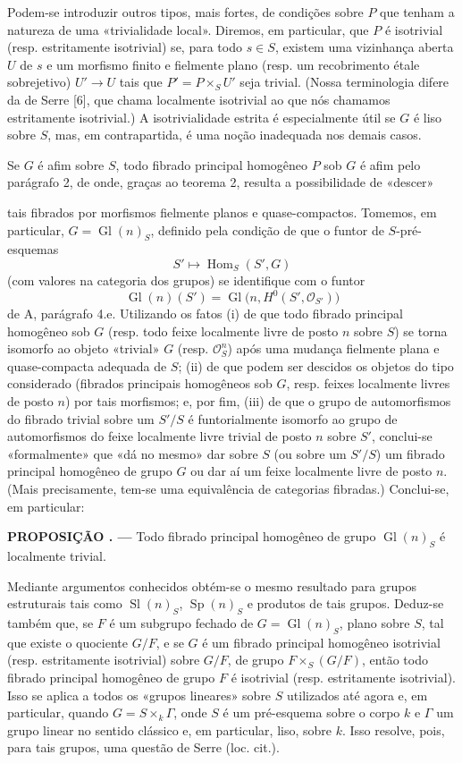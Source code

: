 \documentclass[11pt,twoside,openany]{book}
\numberwithin{equation}{section}
\newcommand{\src}[1]{%
  \phantomsection\hypertarget{src:#1}{}%
  \marginpar{\raggedleft\footnotesize\sffamily #1}%
}
\theoremstyle{plain}
\theoremstyle{definition}
\theoremstyle{remark}
\newcommand{\result}[2]{%
  \par\medskip\noindent\textbf{#1%
  \if\relax\detokenize{#2}\relax\else\space#2\fi. ---}\enspace
}
\newcommand{\FgaUnitKey}{frontmatter}
\renewcommand{\src}[1]{%
  \phantomsection\hypertarget{src:\FgaUnitKey:#1}{}%
  \marginpar{\raggedleft\footnotesize\sffamily #1}%
}
\begin{document}
Podem-se introduzir outros tipos, mais fortes, de condições sobre $P$ que
tenham a natureza de uma «trivialidade local». Diremos, em particular, que
$P$ é isotrivial (resp. estritamente isotrivial) se, para todo $s\in S$,
existem uma vizinhança aberta $U$ de $s$ e um morfismo finito e fielmente plano
(resp. um recobrimento étale sobrejetivo) $U'\longrightarrow U$ tais que
$P'=P\times_SU'$ seja trivial. (Nossa terminologia difere da de Serre [6], que
chama localmente isotrivial ao que nós chamamos estritamente isotrivial.) A
isotrivialidade estrita é especialmente útil se $G$ é liso sobre $S$, mas, em
contrapartida, é uma noção inadequada nos demais casos.

Se $G$ é afim sobre $S$, todo fibrado principal homogêneo $P$ sob $G$ é afim
pelo parágrafo 2, de onde, graças ao teorema 2, resulta a possibilidade de
«descer»

\src{326}
tais fibrados por morfismos fielmente planos e quase-compactos. Tomemos, em
particular, $G=\operatorname{Gl}(n)_S$, definido pela condição de que o
funtor de $S$-pré-esquemas
\[
  S'\longmapsto\operatorname{Hom}_S(S',G)
\]
(com valores na categoria dos grupos) se identifique com o funtor
\[
  \operatorname{Gl}(n)(S')
  =\operatorname{Gl}\bigl(n,H^0(S',\mathcal O_{S'})\bigr)
\]
de A, parágrafo 4.e. Utilizando os fatos (i) de que todo fibrado principal
homogêneo sob $G$ (resp. todo feixe localmente livre de posto $n$ sobre $S$) se
torna isomorfo ao objeto «trivial» $G$ (resp. $\mathcal O_S^n$) após uma mudança
fielmente plana e quase-compacta adequada de $S$; (ii) de que podem ser descidos
os objetos do tipo considerado (fibrados principais homogêneos sob $G$,
resp. feixes localmente livres de posto $n$) por tais morfismos; e, por fim,
(iii) de que o grupo de automorfismos do fibrado trivial sobre um $S'/S$ é
funtorialmente isomorfo ao grupo de automorfismos do feixe localmente livre
trivial de posto $n$ sobre $S'$, conclui-se «formalmente» que «dá no mesmo»
dar sobre $S$ (ou sobre um $S'/S$) um fibrado principal homogêneo de grupo $G$
ou dar aí um feixe localmente livre de posto $n$. (Mais precisamente, tem-se
uma equivalência de categorias fibradas.) Conclui-se, em particular:

\result{PROPOSIÇÃO}{6.1} Todo fibrado principal homogêneo de grupo
$\operatorname{Gl}(n)_S$ é localmente trivial.

Mediante argumentos conhecidos obtém-se o mesmo resultado para grupos
estruturais tais como $\operatorname{Sl}(n)_S$, $\operatorname{Sp}(n)_S$ e
produtos de tais grupos. Deduz-se também que, se $F$ é um subgrupo fechado
de $G=\operatorname{Gl}(n)_S$, plano sobre $S$, tal que existe o quociente
$G/F$, e se $G$ é um fibrado principal homogêneo isotrivial (resp.
estritamente isotrivial) sobre $G/F$, de grupo $F\times_S(G/F)$, então todo
fibrado principal homogêneo de grupo $F$ é isotrivial (resp. estritamente
isotrivial). Isso se aplica a todos os «grupos lineares» sobre $S$ utilizados
até agora e, em particular, quando $G=S\times_k\Gamma$, onde $S$ é um
pré-esquema sobre o corpo $k$ e $\Gamma$ um grupo linear no sentido clássico
e, em particular, liso, sobre $k$. Isso resolve, pois, para tais grupos, uma
questão de Serre (loc. cit.).
\end{document}
